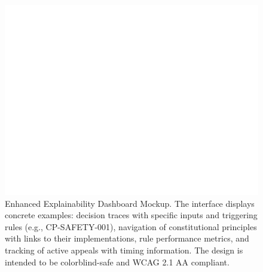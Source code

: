 \documentclass[manuscript,screen,review,anonymous,9pt]{acmart}
\begin{document}
\begin{figure}[htbp]
\centering
\includegraphics[width=\linewidth,keepaspectratio]{Figure_2_Enhanced_Explainability_Dashboard_Mockup.png} %
\caption[Enhanced explainability dashboard mockup]{Enhanced Explainability Dashboard Mockup. The interface displays concrete examples: decision traces with specific inputs and triggering rules (e.g., CP-SAFETY-001), navigation of constitutional principles with links to their implementations, rule performance metrics, and tracking of active appeals with timing information. The design is intended to be colorblind-safe and WCAG 2.1 AA compliant.}
\label{fig:explainability_dashboard}
\end{figure}
\end{document}
